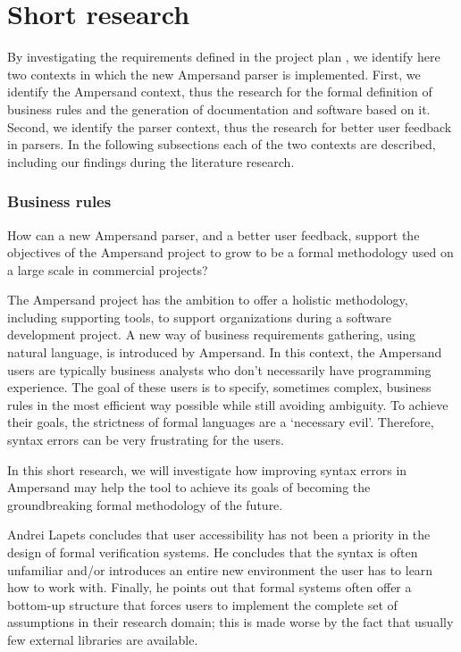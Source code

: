 
\section{Short research}
\label{sec:research}
By investigating the requirements defined in the project plan , we identify here two contexts in which the new Ampersand parser is implemented.
First, we identify the Ampersand context, thus the research for the formal definition of business rules and the generation of documentation and software based  on it.
Second, we identify the parser context, thus the research for better user feedback in parsers.
In the following subsections each of the two contexts are described, including our findings during the literature research.

\subsubsection{Business rules}
How can a new Ampersand parser, and a better user feedback, support the objectives of the Ampersand project to grow to be a formal methodology used on a large scale in commercial projects?

The Ampersand project has the ambition to offer a holistic methodology, including supporting tools, to support organizations during a software development project.
A new way of business requirements gathering, using natural language, is introduced by Ampersand.
In this context, the Ampersand users are typically business analysts who don't necessarily have programming experience.
The goal of these users is to specify, sometimes complex, business rules in the most efficient way possible while still avoiding ambiguity. To achieve their goals, the strictness of formal languages are a `necessary evil'. Therefore, syntax errors can be very frustrating for the users.

In this short research, we will investigate how improving syntax errors in Ampersand may help the tool to achieve its goals of becoming the groundbreaking formal methodology of the future.

Andrei Lapets  concludes that user accessibility has not been a priority in the design of formal verification systems.
He concludes that the syntax is often unfamiliar and/or introduces an entire new environment the user has to learn how to work with.
Finally, he points out that formal systems often offer a bottom-up structure that forces users to implement the complete set of assumptions in their research domain; this is made worse by the fact that usually few external libraries are available.

